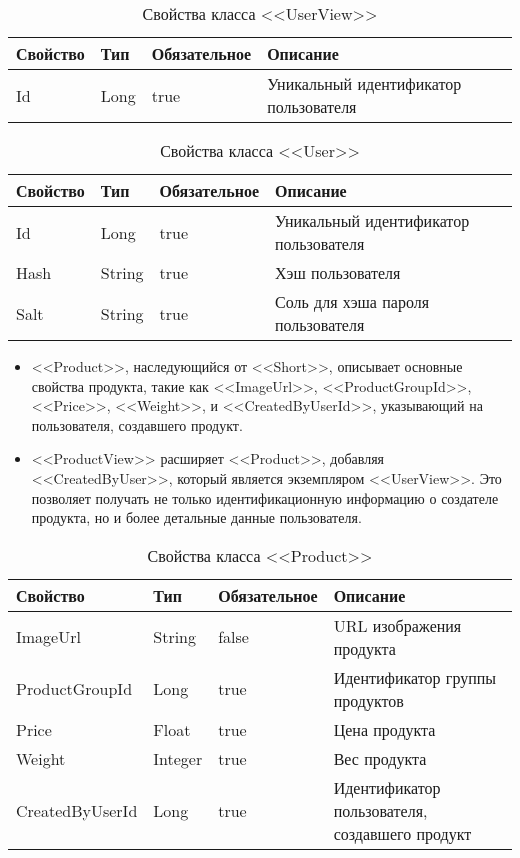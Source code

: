 \begin{xltabular}{\textwidth}{|l|l|p{1.7cm}|X|}
    \caption{Свойства класса <<UserView>>}\\ \hline
    Свойство & Тип & Обязательное & Описание \\ \hline
    Id & Long & true & Уникальный идентификатор пользователя \\ \hline
\end{xltabular}

\begin{xltabular}{\textwidth}{|l|l|p{1.7cm}|X|}
    \caption{Свойства класса <<User>>}\\ \hline
    Свойство & Тип & Обязательное & Описание \\ \hline
    Id & Long & true & Уникальный идентификатор пользователя \\ \hline
    Hash & String & true & Хэш пользователя \\ \hline
    Salt & String & true & Соль для хэша пароля пользователя \\ \hline
\end{xltabular}

\begin{itemize}
    \item <<Product>>, наследующийся от <<Short>>, описывает основные свойства продукта, такие как <<ImageUrl>>, <<ProductGroupId>>, <<Price>>, <<Weight>>, и <<CreatedByUserId>>, указывающий на пользователя, создавшего продукт.
    \item <<ProductView>> расширяет <<Product>>, добавляя <<CreatedByUser>>, который является экземпляром <<UserView>>. Это позволяет получать не только идентификационную информацию о создателе продукта, но и более детальные данные пользователя.
\end{itemize}

\begin{xltabular}{\textwidth}{|l|l|p{1.7cm}|X|}
    \caption{Свойства класса <<Product>>}\\ \hline
    Свойство & Тип & Обязательное & Описание \\ \hline
    ImageUrl & String & false & URL изображения продукта \\ \hline
    ProductGroupId & Long & true & Идентификатор группы продуктов \\ \hline
    Price & Float & true & Цена продукта \\ \hline
    Weight & Integer & true & Вес продукта \\ \hline
    CreatedByUserId & Long & true & Идентификатор пользователя, создавшего продукт \\ \hline
\end{xltabular}

